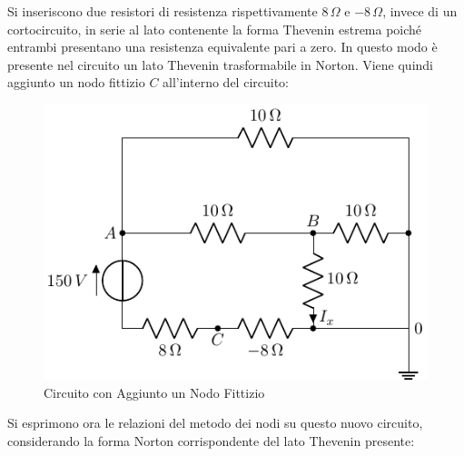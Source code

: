 \documentclass{article}
\numberwithin{equation}{subsection}
\begin{document}
Si inseriscono due resistori di resistenza rispettivamente $8\,\Omega$ e $-8\,\Omega$, invece di un cortocircuito, in serie al lato contenente la forma Thevenin estrema 
poiché entrambi presentano una resistenza equivalente pari a zero. In questo modo è presente nel circuito un lato Thevenin trasformabile in Norton. Viene quindi aggiunto un 
nodo fittizio $C$ all'interno del circuito:
\begin{figure}[H]%
    \centering
    \includegraphics{circuito-3-nodo-fittizio.pdf}
    \caption{Circuito con Aggiunto un Nodo Fittizio}
    \label{fig:circuito-3-nodo-fittizio}
\end{figure}
Si esprimono ora le relazioni del metodo dei nodi su questo nuovo circuito, considerando la forma Norton corrispondente del lato Thevenin presente: 
\end{document}
